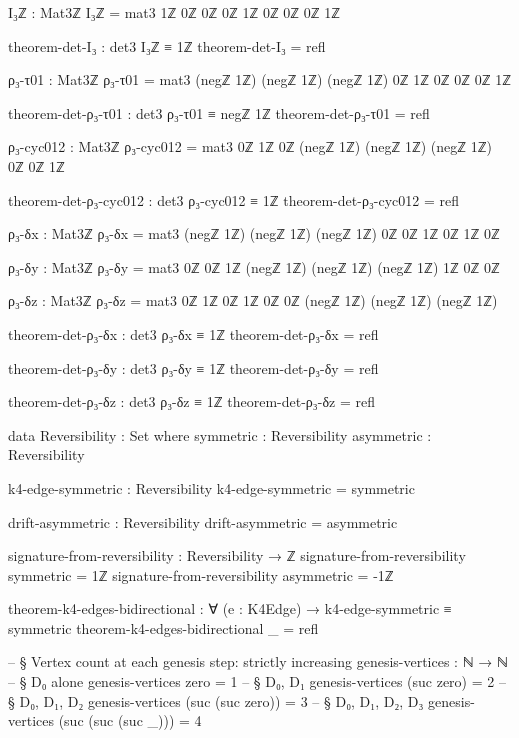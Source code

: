 \documentclass[11pt,a4paper]{book}
\begin{document}
\begin{code}
I₃ℤ : Mat3ℤ
I₃ℤ = mat3 1ℤ 0ℤ 0ℤ 0ℤ 1ℤ 0ℤ 0ℤ 0ℤ 1ℤ

theorem-det-I₃ : det3 I₃ℤ ≡ 1ℤ
theorem-det-I₃ = refl

ρ₃-τ01 : Mat3ℤ
ρ₃-τ01 = mat3 (negℤ 1ℤ) (negℤ 1ℤ) (negℤ 1ℤ)
              0ℤ          1ℤ          0ℤ
              0ℤ          0ℤ          1ℤ

theorem-det-ρ₃-τ01 : det3 ρ₃-τ01 ≡ negℤ 1ℤ
theorem-det-ρ₃-τ01 = refl

ρ₃-cyc012 : Mat3ℤ
ρ₃-cyc012 = mat3 0ℤ          1ℤ          0ℤ
                 (negℤ 1ℤ) (negℤ 1ℤ) (negℤ 1ℤ)
                  0ℤ          0ℤ          1ℤ

theorem-det-ρ₃-cyc012 : det3 ρ₃-cyc012 ≡ 1ℤ
theorem-det-ρ₃-cyc012 = refl

ρ₃-δx : Mat3ℤ
ρ₃-δx = mat3 (negℤ 1ℤ) (negℤ 1ℤ) (negℤ 1ℤ)
              0ℤ          0ℤ          1ℤ
              0ℤ          1ℤ          0ℤ

ρ₃-δy : Mat3ℤ
ρ₃-δy = mat3  0ℤ          0ℤ          1ℤ
             (negℤ 1ℤ) (negℤ 1ℤ) (negℤ 1ℤ)
              1ℤ          0ℤ          0ℤ

ρ₃-δz : Mat3ℤ
ρ₃-δz = mat3  0ℤ          1ℤ          0ℤ
               1ℤ          0ℤ          0ℤ
             (negℤ 1ℤ) (negℤ 1ℤ) (negℤ 1ℤ)

theorem-det-ρ₃-δx : det3 ρ₃-δx ≡ 1ℤ
theorem-det-ρ₃-δx = refl

theorem-det-ρ₃-δy : det3 ρ₃-δy ≡ 1ℤ
theorem-det-ρ₃-δy = refl

theorem-det-ρ₃-δz : det3 ρ₃-δz ≡ 1ℤ
theorem-det-ρ₃-δz = refl

data Reversibility : Set where
  symmetric  : Reversibility
  asymmetric : Reversibility

k4-edge-symmetric : Reversibility
k4-edge-symmetric = symmetric

drift-asymmetric : Reversibility
drift-asymmetric = asymmetric

signature-from-reversibility : Reversibility → ℤ
signature-from-reversibility symmetric  = 1ℤ
signature-from-reversibility asymmetric = -1ℤ

theorem-k4-edges-bidirectional : ∀ (e : K4Edge) → k4-edge-symmetric ≡ symmetric
theorem-k4-edges-bidirectional _ = refl

-- § Vertex count at each genesis step: strictly increasing
genesis-vertices : ℕ → ℕ
-- § D₀ alone
genesis-vertices zero = 1
-- § D₀, D₁
genesis-vertices (suc zero) = 2
-- § D₀, D₁, D₂
genesis-vertices (suc (suc zero)) = 3
-- § D₀, D₁, D₂, D₃
genesis-vertices (suc (suc (suc _))) = 4


\end{code}
\end{document}
